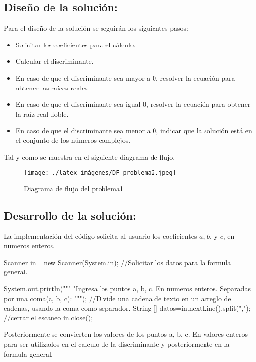 \subsection{\textbf{Diseño de la solución:}}

Para el diseño de la solución se seguirán los siguientes pasos:
\begin{itemize}
    \item Solicitar los coeficientes para el cálculo.
    \item Calcular el discriminante.
    \item En caso de que el discriminante sea mayor a 0, resolver la ecuación para obtener las raíces reales.
    \item En caso de que el discriminante sea igual 0, resolver la ecuación para obtener la raíz real doble.
    \item En caso de que el discriminante sea menor a 0, indicar que la solución está en el conjunto de los números complejos.
\end{itemize}

Tal y como se muestra en el siguiente diagrama de flujo.

\begin{figure}[h!]
    \centering
    \texttt{[image: ./latex-imágenes/DF\_problema2.jpeg]}
    \caption{Diagrama de flujo del problema1}
    \label{fig:Diagramadeflujodel problema1}
\end{figure}

\subsection{\textbf{Desarrollo de la solución:}}
La implementación del código solicita al usuario los coeficientes \(a\), \(b\), y \(c\), en numeros enteros. 
\begin{javaCode}
 Scanner in= new Scanner(System.in);
        //Solicitar los datos para la formula general.
        
        System.out.println("""
                           "Ingresa los puntos a, b, c.
                           En numeros enteros.
                           Separadas por una coma(a, b, c): 
                           """);
        //Divide una cadena de texto en un arreglo de cadenas, usando la coma como separador.
        String [] datos=in.nextLine().split(",");
        //cerrar el escaneo
        in.close();
        
\end{javaCode}
Posteriormente se convierten los valores de los puntos a, b, c. En valores enteros para ser utilizados  en el calculo de la discriminante y posteriormente en la formula general.

